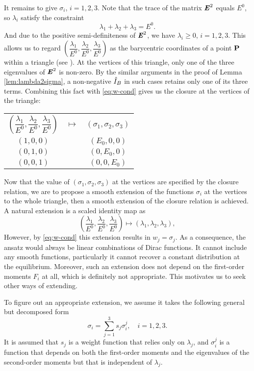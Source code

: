It remains to give $\sigma_i$, $i = 1,2,3$. Note that the trace of the
matrix $\boldsymbol{\mathit{E}}^2$ equals $E^0$, so $\lambda_i$ satisfy the constraint
\[
\lambda_1 + \lambda_2 + \lambda_3 = E^0.
\]
And due to the positive semi-definiteness of $\boldsymbol{\mathit{E}}^2$, we have
$\lambda_i\geq0$, $i=1,2,3$. This allows us to regard
$\left( \dfrac{\lambda_1}{E^0}, \dfrac{\lambda_2}{E^0},
  \dfrac{\lambda_3}{E^0} \right)$
as the barycentric coordinates of a point $\mathbf{P}$ within a triangle (see
). At the vertices of this triangle,
only one of the three eigenvalues of $\boldsymbol{\mathit{E}}^2$ is non-zero. By the
similar arguments in the proof of Lemma \ref{lem:lambda2sigma}, a
non-negative $\hat I_B$ in such cases retains only one of its three
terms. Combining this fact with \eqref{eq:w-cond} gives us the
closure at the vertices of the triangle:
\begin{center}
\begin{tabular}{ccc}
  $\left( \dfrac{\lambda_1}{E^0}, \dfrac{\lambda_2}{E^0},
  \dfrac{\lambda_3}{E^0} \right)$ & $\mapsto$ & 
  $(\sigma_1, \sigma_2, \sigma_3)$ \\
  $(1, 0, 0)$ & & $(E_0, 0, 0)$ \\
  $(0, 1, 0)$ & & $(0, E_0, 0)$ \\
  $(0, 0, 1)$ & & $(0, 0, E_0)$ \\
\end{tabular}
\end{center}
Now that the value of $(\sigma_1, \sigma_2, \sigma_3)$ at the vertices
are specified by the closure relation, we are to propose a smooth
extension of the functions $\sigma_i$ at the vertices to the whole
triangle, then a smooth extension of the closure relation is
achieved. A natural extension is a scaled identity map as
\[
\left( \dfrac{\lambda_1}{E^0}, \dfrac{\lambda_2}{E^0},
  \dfrac{\lambda_3}{E^0} \right) \mapsto \left( \lambda_1, \lambda_2,
  \lambda_3 \right),
\]
However, by \eqref{eq:w-cond} this extension results in
$w_j = \sigma_j$. As a consequence, the ansatz would always be linear
combinations of Dirac functions. It cannot include any smooth
functions, particularly it cannot recover a constant distribution at
the equilibrium. Moreover, such an extension does not depend on the
first-order moments $F_i$ at all, which is definitely not
appropriate. This motivates us to seek other ways of extending.

To figure out an appropriate extension, we assume it takes the following  
general but decomposed form
\begin{equation}\label{eq:sigma-decompose}
\sigma_i = \sum_{j=1}^3 s_j \sigma_i^j, \quad i = 1,2,3.
\end{equation}
It is assumed that $s_j$ is a weight function that relies only on $\lambda_j$, 
and $\sigma_i^j$ is a function that depends on both the first-order moments and the eigenvalues 
of the second-order moments but that is independent of $\lambda_j$. 

